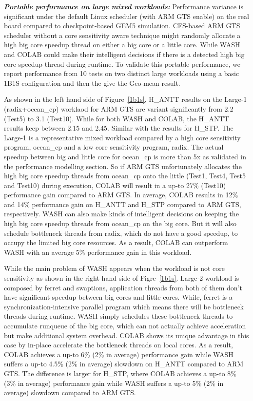 \textbf{\textit{Portable performance on large mixed workloads:}}
Performance variance is significant under the default Linux scheduler (with ARM GTS enable) on the real board compared to checkpoint-based GEM5 simulation. CFS-based ARM GTS scheduler without a core sensitivity aware technique might randomly allocate a high big core speedup thread on either a  big core or a little core.  While WASH and COLAB could make their intelligent decisions if there is a detected high big core speedup thread during runtime. To validate this portable performance, we report performance from 10 tests on two distinct large workloads using a basic 1B1S configuration and then the give the Geo-mean result. 

As shown in the left hand side of Figure~\ref{1b1s}, H\_ANTT results on the Large-1 (radix+ocean\_cp) worklaod for ARM GTS are variant significantly from 2.2 (Test5) to 3.1 (Test10). While for both WASH and COLAB, the H\_ANTT results keep between 2.15 and 2.45. Similar with the results for H\_STP. The Large-1 is a representative mixed workload compared by a high core sensitivity program, ocean\_cp and a low core sensitivity program, radix. The actual speedup between big and little core for ocean\_cp is more than 5x as validated in the performance modelling section. So if ARM GTS unfortunately allocates the high big core speedup threads from ocean\_cp onto the little (Test1, Test4, Test5 and Test10) during execution, COLAB will result in a up-to 27\% (Test10) performance gain compared to ARM GTS. In average, COLAB results in 12\% and 14\% performance gain on H\_ANTT and H\_STP compared to ARM GTS, respectively. WASH can also make kinds of intelligent decisions on keeping the high big core speedup threads from ocean\_cp on the big core. But it will also schedule bottleneck threads from radix, which do not have a good speedup, to occupy the limited big core resources. As a result, COLAB can outperform WASH with an average 5\% performance gain in this workload.

While the main problem of WASH appears when the workload is not core sensitivity as shown in the right hand side of Figre~\ref{1b1s}. Large-2 workload is composed by ferret and swaptions, application threads from both of them don't have significant speedup between big cores and little cores. While, ferret is a synchronization-intensive parallel program which means there will be bottleneck threads during runtime. WASH simply schedules these bottleneck threads to accumulate runqueue of the big core, which can not actually achieve acceleration but make additional system overhead. COLAB shows its unique advantage in this case by in-place accelerate the bottleneck threads on local cores. As a result, COLAB achieves a up-to 6\% (2\% in average) performance gain while WASH suffers a up-to 4.5\% (2\% in average) slowdown on H\_ANTT compared to ARM GTS. The difference is larger for H\_STP, where COLAB achieves a up-to 8\% (3\% in average) performance gain while WASH suffers a up-to 5\% (2\% in average) slowdown compared to ARM GTS.

